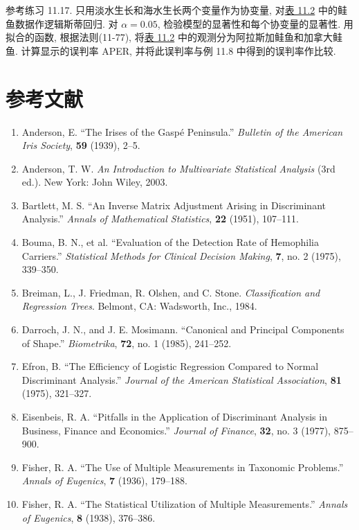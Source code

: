 
\quad 参考练习 11.17. 只用淡水生长和海水生长两个变量作为协变量, 对\hyperref[tab:11.2]{表 11.2} 中的鲑鱼数据作逻辑斯蒂回归. 对 $\alpha=0.05$, 检验模型的显著性和每个协变量的显著性. 用拟合的函数, 根据法则(11-77), 将\hyperref[tab:11.2]{表 11.2} 中的观测分为阿拉斯加鲑鱼和加拿大鲑鱼. 计算显示的误判率 APER, 并将此误判率与例 11.8 中得到的误判率作比较.

\label{bib:9}
\section*{参考文献}

\begin{enumerate}
\item Anderson, E. “The Irises of the Gaspé Peninsula.” \textit{Bulletin of the American Iris Society}, \textbf{59} (1939), 2--5.
\item Anderson, T. W. \textit{An Introduction to Multivariate Statistical Analysis} (3rd ed.). New York: John Wiley, 2003.
\item Bartlett, M. S. “An Inverse Matrix Adjustment Arising in Discriminant Analysis.” \textit{Annals of Mathematical Statistics}, \textbf{22} (1951), 107--111.
\item Bouma, B. N., et al. “Evaluation of the Detection Rate of Hemophilia Carriers.” \textit{Statistical Methods for Clinical Decision Making}, \textbf{7}, no. 2 (1975), 339--350.
\item Breiman, L., J. Friedman, R. Olshen, and C. Stone. \textit{Classification and Regression Trees}. Belmont, CA: Wadsworth, Inc., 1984.
\item Darroch, J. N., and J. E. Mosimann. “Canonical and Principal Components of Shape.” \textit{Biometrika}, \textbf{72}, no. 1 (1985), 241--252.
\item Efron, B. “The Efficiency of Logistic Regression Compared to Normal Discriminant Analysis.” \textit{Journal of the American Statistical Association}, \textbf{81} (1975), 321--327.
\item Eisenbeis, R. A. “Pitfalls in the Application of Discriminant Analysis in Business, Finance and Economics.” \textit{Journal of Finance}, \textbf{32}, no. 3 (1977), 875--900.
\item Fisher, R. A. “The Use of Multiple Measurements in Taxonomic Problems.” \textit{Annals of Eugenics}, \textbf{7} (1936), 179--188.
\item Fisher, R. A. “The Statistical Utilization of Multiple Measurements.” \textit{Annals of Eugenics}, \textbf{8} (1938), 376--386.

\end{enumerate}
